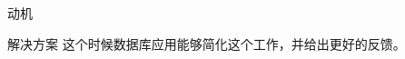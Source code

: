 \documentclass{beamer}
\begin{document}
\begin{frame}{动机}
   {
    \begin{block}{解决方案}
    这个时候数据库应用能够简化这个工作，并给出更好的反馈。
    \end{block}
  }



  



  


  
\end{frame}
\end{document}
